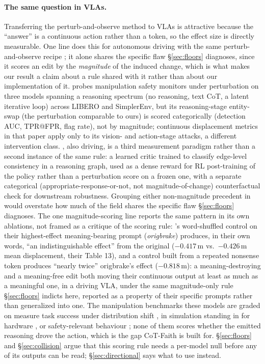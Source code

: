 \documentclass{article}
\begin{document}
\paragraph{The same question in VLAs.} Transferring the perturb-and-observe method to VLAs \citep{openvla,rt2,octo,ecot,cotvla,ecotlite} is attractive because the ``answer'' is a continuous action rather than a token, so the effect size is directly measurable. One line does this for autonomous driving with the same perturb-and-observe recipe \citep{vladrivebench}; it alone shares the specific flaw \S\ref{sec:floors} diagnoses, since it scores an edit by the \emph{magnitude} of the induced change, which is what makes our result a claim about a rule shared with it rather than about our implementation of it. \citet{doubleedged} probes manipulation safety monitors under perturbation on three models spanning a reasoning spectrum (no reasoning, text CoT, a latent iterative loop) across LIBERO and SimplerEnv, but its reasoning-stage entity-swap (the perturbation comparable to ours) is scored categorically (detection AUC, TPR@FPR, flag rate), not by magnitude; continuous displacement metrics in that paper apply only to its vision- and action-stage attacks, a different intervention class. \citet{pinocchio}, also driving, is a third measurement paradigm rather than a second instance of the same rule: a learned critic trained to classify edge-level consistency in a reasoning graph, used as a dense reward for RL post-training of the policy rather than a perturbation score on a frozen one, with a separate categorical (appropriate-response-or-not, not magnitude-of-change) counterfactual check for downstream robustness. Grouping either non-magnitude precedent in would overstate how much of the field shares the specific flaw \S\ref{sec:floors} diagnoses. The one magnitude-scoring line reports the same pattern in its own ablations, not framed as a critique of the scoring rule: \citet{vladrivebench}'s word-shuffled control on their highest-effect meaning-bearing prompt (\emph{origbrake}) produces, in their own words, ``an indistinguishable effect'' from the original ($-0.417$\,m vs.\ $-0.426$\,m mean displacement, their Table 13), and a control built from a repeated nonsense token produces ``nearly twice'' origbrake's effect ($-0.818$\,m): a meaning-destroying and a meaning-free edit both moving their continuous output at least as much as a meaningful one, in a driving VLA, under the same magnitude-only rule \S\ref{sec:floors} indicts here, reported as a property of their specific prompts rather than generalized into one. The manipulation benchmarks these models are graded on measure task success under distribution shift \citep{colosseum,vlabench}, in simulation standing in for hardware \citep{simplerenv}, or safety-relevant behaviour \citep{liberosafety}; none of them scores whether the emitted reasoning drove the action, which is the gap CoT-Faith is built for. \S\ref{sec:floors} and \S\ref{sec:collision} argue that this scoring rule needs a per-model null before any of its outputs can be read; \S\ref{sec:directional} says what to use instead.
\end{document}
